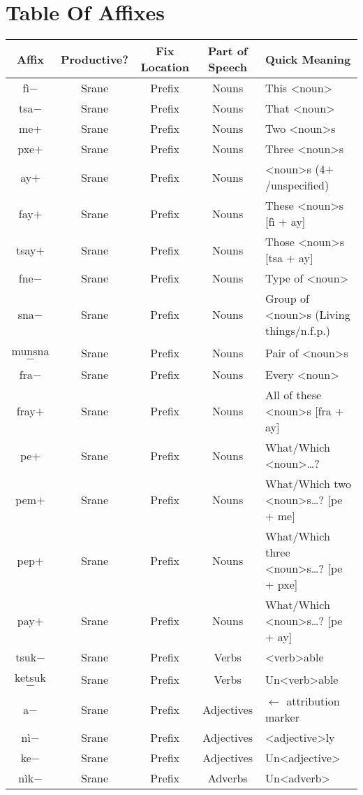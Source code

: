 \chapter{Table Of Affixes}
\begin{center}
\begin{longtable}[c]{|c c c c l|}
\hline
Affix & Productive? & Fix Location & Part of Speech & Quick Meaning\\
\hline
\endhead
\hline
\endfoot
{fì$-$} & Srane & Prefix & Nouns & This <noun>\\
{tsa$-$} & Srane & Prefix & Nouns & That <noun>\\
{me$+$} & Srane & Prefix & Nouns & Two <noun>s\\
{pxe$+$} & Srane & Prefix & Nouns & Three <noun>s\\
{ay$+$} & Srane & Prefix & Nouns & <noun>s (4$+$/unspecified)\\
{fay$+$} & Srane & Prefix & Nouns & These <noun>s [fì + ay]\\
{tsay$+$} & Srane & Prefix & Nouns & Those <noun>s [tsa + ay]\\
{fne$-$} & Srane & Prefix & Nouns & Type of <noun>\\
{sna$-$} & Srane & Prefix & Nouns & Group of <noun>s (Living things/n.f.p.)\\
{munsna$-$} & Srane & Prefix & Nouns & Pair of <noun>s\\
{fra$-$} & Srane & Prefix & Nouns & Every <noun>\\
{fray$+$} & Srane & Prefix & Nouns & All of these <noun>s [fra + ay]\\
{pe$+$} & Srane & Prefix & Nouns & What/Which <noun>\ldots ?\\
{pem$+$} & Srane & Prefix & Nouns & What/Which two <noun>s\ldots ? [pe + me]\\
{pep$+$} & Srane & Prefix & Nouns & What/Which three <noun>s\ldots ? [pe + pxe]\\
{pay$+$} & Srane & Prefix & Nouns & What/Which <noun>s\ldots ? [pe + ay]\\
{tsuk$-$} & Srane & Prefix & Verbs & <verb>able\\
{ketsuk$-$} & Srane & Prefix & Verbs & Un<verb>able\\
{a$-$} & Srane & Prefix & Adjectives & $\leftarrow$ attribution marker\\
{nì$-$} & Srane & Prefix & Adjectives & <adjective>ly\\
{ke$-$} & Srane & Prefix & Adjectives & Un<adjective>\\
{nìk$-$} & Srane & Prefix & Adverbs & Un<adverb>\\

\end{longtable}
\end{center}
